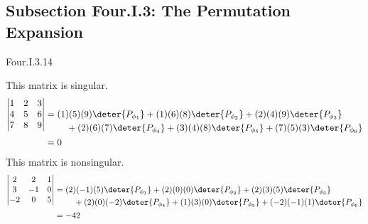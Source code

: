 \subsection{Subsection Four.I.3: The Permutation Expansion}
\begin{ans}{Four.I.3.14}
      \begin{exparts}
        \partsitem This matrix is singular.
          \begin{align*}
            \begin{vmatrix}
              1  &2  &3  \\
              4  &5  &6  \\
              7  &8  &9
            \end{vmatrix}
            &=
            \begin{aligned}[t]
              &(1)(5)(9)\deter{P_{\phi_1}}
              +(1)(6)(8)\deter{P_{\phi_2}}
              +(2)(4)(9)\deter{P_{\phi_3}}  \\
              &\hbox{}\quad\hbox{}
              +(2)(6)(7)\deter{P_{\phi_4}}
              +(3)(4)(8)\deter{P_{\phi_5}}
              +(7)(5)(3)\deter{P_{\phi_6}}
            \end{aligned}                        \\
            &=0
          \end{align*}
        \partsitem This matrix is nonsingular.
          \begin{align*}
            \begin{vmatrix}
              2  &2  &1  \\
              3  &-1 &0  \\
              -2 &0  &5
            \end{vmatrix}
            &=
            \begin{aligned}[t]
              &(2)(-1)(5)\deter{P_{\phi_1}}
              +(2)(0)(0)\deter{P_{\phi_2}}
              +(2)(3)(5)\deter{P_{\phi_3}} \\
              &\hbox{}\quad\hbox{}
              +(2)(0)(-2)\deter{P_{\phi_4}}
              +(1)(3)(0)\deter{P_{\phi_5}}
              +(-2)(-1)(1)\deter{P_{\phi_6}}
            \end{aligned}                      \\
            &=-42
        \end{align*}
      \end{exparts}
    
\end{ans}
